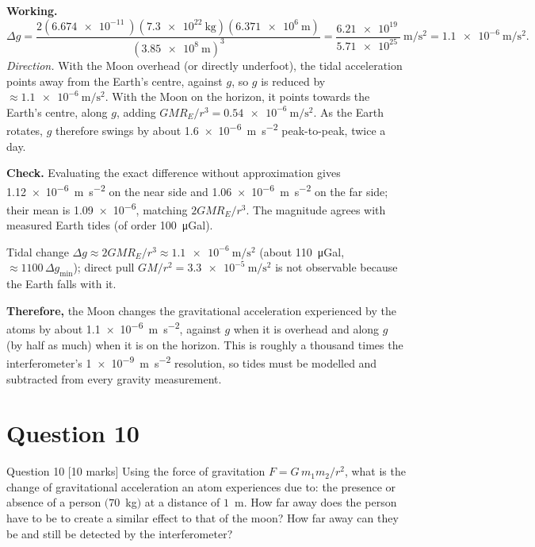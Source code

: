 \documentclass[11pt]{article}
\newcommand{\closing}[1]{\par\medskip\noindent\textbf{Therefore,} #1}
\begin{document}
\textbf{Working.}
\[
\Delta g = \frac{2(\SI{6.674e-11}{})(\SI{7.3e22}{\kilogram})(\SI{6.371e6}{\metre})}{(\SI{3.85e8}{\metre})^3}
= \frac{\SI{6.21e19}{}}{\SI{5.71e25}{}}\ \si{\metre\per\second\squared}
= \SI{1.1e-6}{\metre\per\second\squared}.
\]
\emph{Direction.} With the Moon overhead (or directly underfoot), the tidal acceleration points away
from the Earth's centre, against $g$, so $g$ is reduced by $\approx\SI{1.1e-6}{\metre\per\second\squared}$.
With the Moon on the horizon, it points towards the Earth's centre, along $g$, adding
$GMR_E/r^3 = \SI{0.54e-6}{\metre\per\second\squared}$. As the Earth rotates, $g$ therefore swings by about
\SI{1.6e-6}{\metre\per\second\squared} peak-to-peak, twice a day.

\textbf{Check.} Evaluating the exact difference without approximation gives
\SI{1.12e-6}{\metre\per\second\squared} on the near side and \SI{1.06e-6}{\metre\per\second\squared}
on the far side; their mean is \SI{1.09e-6}{}, matching $2GMR_E/r^3$. The magnitude agrees with
measured Earth tides (of order \SI{100}{\micro Gal}).

\begin{answerbox}
Tidal change $\Delta g \approx 2GMR_E/r^3 \approx \SI{1.1e-6}{\metre\per\second\squared}$
(about \SI{110}{\micro Gal}, $\approx 1100\,\Delta g_{\min}$); direct pull $GM/r^2 = \SI{3.3e-5}{\metre\per\second\squared}$
is not observable because the Earth falls with it.
\closing{the Moon changes the gravitational acceleration experienced by the atoms by about
\SI{1.1e-6}{\metre\per\second\squared}, against $g$ when it is overhead and along $g$ (by half as much)
when it is on the horizon. This is roughly a thousand times the interferometer's
\SI{1e-9}{\metre\per\second\squared} resolution, so tides must be modelled and subtracted from every
gravity measurement.}
\end{answerbox}

\section{Question 10}

\begin{problembox}{Question 10 \hfill [10 marks]}
Using the force of gravitation $F=G\,m_1 m_2/r^2$, what is the change of gravitational acceleration an
atom experiences due to: the presence or absence of a person $(70$~kg$)$ at a distance of $1$~m. How
far away does the person have to be to create a similar effect to that of the moon? How far away can
they be and still be detected by the interferometer?
\end{problembox}
\end{document}
